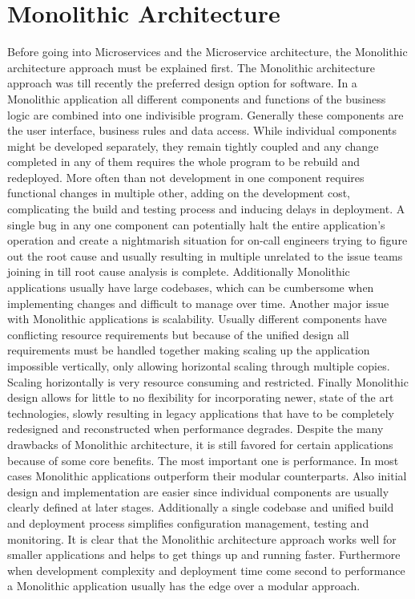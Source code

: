 \documentclass{article}
\begin{document}
\section{Monolithic Architecture}

Before going into Microservices and the Microservice architecture, the Monolithic architecture approach must be explained first. The Monolithic architecture approach was till recently the preferred design option for software. In a Monolithic application all different components and functions of the business logic are combined into one indivisible program\cite{monovsmicro}. Generally these components are the user interface, business rules and data access. While individual components might be developed separately, they remain tightly coupled\cite{whatismono} and any change completed in any of them requires the whole program to be rebuild and redeployed\cite{app10175797}. More often than not development in one component requires functional changes in multiple other, adding on the development cost, complicating the build and testing process and inducing delays in deployment. A single bug in any one component can potentially halt the entire application's operation and create a nightmarish situation for on-call engineers trying to figure out the root cause and usually resulting in multiple unrelated to the issue teams joining in till root cause analysis is complete. Additionally Monolithic applications usually have large codebases, which can be cumbersome when implementing changes and difficult to manage over time\cite{whatismono}. Another major issue with Monolithic applications is scalability. Usually different components have conflicting resource requirements but because of the unified design all requirements must be handled together making scaling up the application impossible vertically, only allowing horizontal scaling through multiple copies. Scaling horizontally is very resource consuming and restricted. Finally Monolithic design allows for little to no flexibility for incorporating newer, state of the art technologies, slowly resulting in legacy applications that have to be completely redesigned and reconstructed when performance degrades. Despite the many drawbacks of Monolithic architecture, it is still favored for certain applications because of some core benefits. The most important one is performance. In most cases Monolithic applications outperform their modular counterparts\cite{whatismono}. Also initial design and implementation are easier since individual components are usually clearly defined at later stages. Additionally a single codebase and unified build and deployment process simplifies configuration management, testing and monitoring\cite{whatismono}. It is clear that the Monolithic architecture approach works well for smaller applications and helps to get things up and running faster. Furthermore when development complexity and deployment time come second to performance a Monolithic application usually has the edge over a modular approach.
\end{document}
